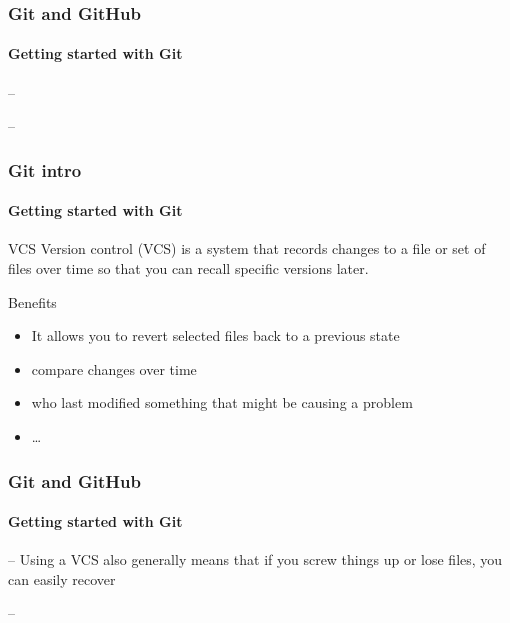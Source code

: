 \begin{frame}
    \frametitle{Git and GitHub}
    \framesubtitle{Getting started with Git}
    \addtocounter{nframe}{1}
    
    \begin{block}{--}
    \end{block}

    \begin{block}{--}
    \end{block}

\end{frame}

\begin{frame}
    \frametitle{Git intro}
    \framesubtitle{Getting started with Git}
    \addtocounter{nframe}{1}
    
    \begin{block}{VCS}
        Version control (VCS) is a system that records changes to a file or set of files over time so that you can recall specific versions later.
    \end{block}

    \begin{block}{Benefits}
        \begin{itemize}
            \item It allows you to revert selected files back to a previous state
            \item compare changes over time
            \item who last modified something that might be causing a problem
            \item \dots
        \end{itemize}
    \end{block}

\end{frame}


\begin{frame}
    \frametitle{Git and GitHub}
    \framesubtitle{Getting started with Git}
    \addtocounter{nframe}{1}
    
    \begin{block}{--}
        Using a VCS also generally means that if you screw things up or lose files, you can easily recover
    \end{block}

    \begin{block}{--}
    \end{block}

\end{frame}

